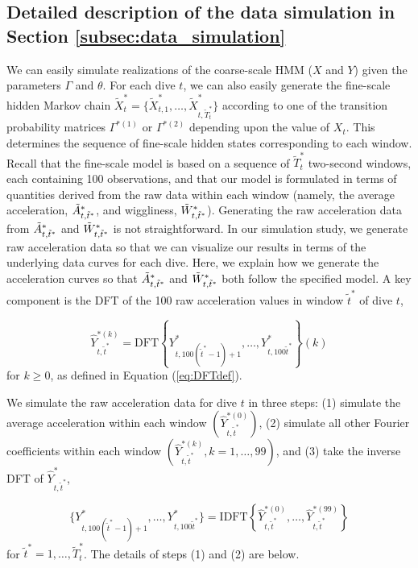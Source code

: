 \subsection{Detailed description of the data simulation in Section \ref{subsec:data_simulation}}


\setcounter{equation}{7}   %

We can easily simulate realizations of the coarse-scale HMM ($X$ and $Y$) given the parameters $\Gamma$ and $\theta$. For each dive $t$, we can also easily generate the fine-scale hidden Markov chain $\tilde X^*_t = \big\{\tilde X^*_{t,1},\ldots,\tilde X^*_{t,\tilde T_t^*}\big\}$ according to one of the transition probability matrices $\Gamma^{*(1)}$ or $\Gamma^{*(2)}$ depending upon the value of $X_t$. This determines the sequence of fine-scale hidden states corresponding to each window. Recall that the fine-scale model is based on a sequence of $\tilde T_t^*$ two-second windows, each containing 100 observations, and that our model is formulated in terms of quantities derived from the raw data within each window (namely, the average acceleration, $\tilde{A}^*_{t,\tilde t^*}$, and wiggliness, $\tilde{W}^*_{ t,\tilde t^*}$). Generating the raw acceleration data from $\tilde{A}^*_{t,\tilde t^*}$ and $\tilde{W}^*_{ t,\tilde t^*}$ is not straightforward. In our simulation study, we generate raw acceleration data so that we can visualize our results in terms of the underlying data curves for each dive. Here, we explain how we generate the acceleration curves so that $\tilde{A}^*_{t,\tilde t^*}$ and $\tilde{W}^*_{ t,\tilde t^*}$ both follow the specified model. A key component is the DFT of the 100 raw acceleration values in window $\tilde{t}^*$ of dive $t$,

\[
    \hat{Y}^{*(k)}_{t,\tilde{t}^*}  = \mathrm{DFT}\left\{Y^*_{t,100 (\tilde{t}^*-1) + 1 },\ldots, Y^*_{t,100 \tilde{t}^*}\right\}(k)
\]
for $k \geq 0$, as defined in Equation (\ref{eq:DFTdef}).

We simulate the raw acceleration data for dive $t$ in three steps: (1) simulate the average acceleration within each window $\left(\hat Y^{*(0)}_{t,\tilde t^*}\right)$, (2) simulate all other Fourier coefficients within each window $\left(\hat Y^{*(k)}_{t,\tilde t^*}, k = 1,\ldots,99\right)$, and (3) take the inverse DFT of $\hat{Y}^*_{t,\tilde t^*}$,

\[
    \{Y^*_{t,100(\tilde t^* - 1) + 1},\ldots,Y^*_{t,100\tilde t^*}\} = \mathrm{IDFT}\left\{\hat{Y}^{*(0)}_{t,\tilde t^*},
    \ldots, \hat{Y}^{*(99)}_{t,\tilde t^*}\right\}
\]
for $\tilde t^* = 1,\ldots,\tilde T^*_t$. The details of steps (1) and (2) are below.

